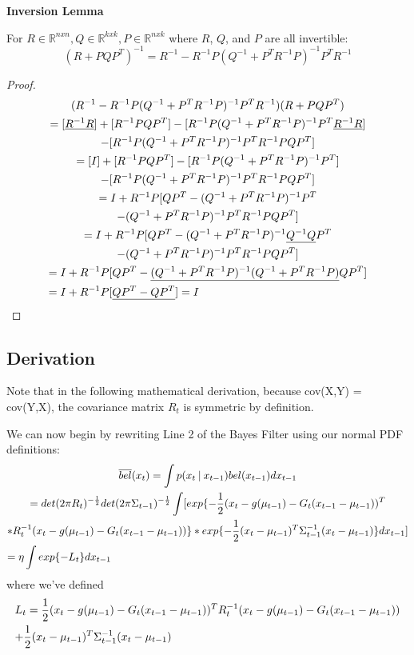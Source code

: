 \begin{lemma}{\textbf{Inversion Lemma \cite{probabilisticRobotics}}} \label{lemmaInversion}
	
For \(R \in \mathbb{R}^{nxn}, Q \in \mathbb{R}^{kxk}, P \in \mathbb{R}^{nxk}\) where \(R\), \(Q\), and \(P\) are all invertible:
\[
(R + PQP^T)^{-1} = R^{-1} - R^{-1}P(Q^{-1} + P^T R^{-1}P)^{-1} P^T R^{-1}
\]
\end{lemma}
\begin{proof}
\begin{multline}
( R^{-1} - R^{-1}P(Q^{-1} + P^T R^{-1}P)^{-1} P^T R^{-1}) (R + PQP^T) \\
= [\underline{R^{-1}R}] + [R^{-1}PQP^T] - [R^{-1}P(Q^{-1} + P^T R^{-1}P)^{-1} P^T \underline{R^{-1}R}] \\
- [R^{-1}P(Q^{-1} + P^T R^{-1}P)^{-1} P^T R^{-1}PQP^T] \\
= [I] + [R^{-1}PQP^T] - [R^{-1}P(Q^{-1} + P^T R^{-1}P)^{-1} P^T] \\
- [R^{-1}P(Q^{-1} + P^T R^{-1}P)^{-1} P^T R^{-1}PQP^T] \\
= I + R^{-1}P [QP^T - (Q^{-1} + P^T R^{-1}P)^{-1} P^T \\
- (Q^{-1} + P^T R^{-1}P)^{-1} P^T R^{-1}PQP^T] \\
= I + R^{-1}P [QP^T - (Q^{-1} + P^T R^{-1}P)^{-1} \underline{Q^{-1} Q} P^T \\
- (Q^{-1} + P^T R^{-1}P)^{-1} P^T R^{-1}PQP^T] \\
= I + R^{-1}P [QP^T - \underline{(Q^{-1} + P^T R^{-1}P)^{-1} (Q^{-1} + P^T R^{-1}P)} Q P^T] \\
= I + R^{-1}P [\underline{QP^T - Q P^T}] = I \hfill
\end{multline}
\end{proof}


\subsection{Derivation}
Note that in the following mathematical derivation, because cov(X,Y) = cov(Y,X), the covariance matrix \(R_t\) is symmetric by definition.

We can now begin by rewriting Line 2 of the Bayes Filter using our normal PDF definitions:
\begin{multline} \label{eqBelBarLt}
\overline{bel}(x_t) = \int p(x_t \mathbin{\vert} x_{t-1}) bel(x_{t-1})dx_{t-1} \\
= det(2 \pi R_t)^{-\frac{1}{2}} det(2 \pi \Sigma_{t-1})^{-\frac{1}{2}} \int [ exp\{-\frac{1}{2} (x_t - g(\mu_{t-1}) - G_t (x_{t-1} - \mu_{t-1}))^T \\ * R_t^{-1} (x_t - g(\mu_{t-1}) - G_t (x_{t-1} - \mu_{t-1}))\} * exp \{-\frac{1}{2} (x_t - \mu_{t-1})^T \Sigma_{t-1}^{-1} (x_t - \mu_{t-1}) \}dx_{t-1} ] \\
= \eta \int exp\{-L_t\}dx_{t-1} \hfill
\end{multline}
where we've defined
\begin{multline}
L_t = \frac{1}{2} (x_t - g(\mu_{t-1}) - G_t (x_{t-1} - \mu_{t-1}))^T R_t^{-1} (x_t - g(\mu_{t-1}) - G_t (x_{t-1} - \mu_{t-1}))\\
+ \frac{1}{2} (x_t - \mu_{t-1})^T \Sigma_{t-1}^{-1} (x_t - \mu_{t-1}) \hfill
\end{multline}

